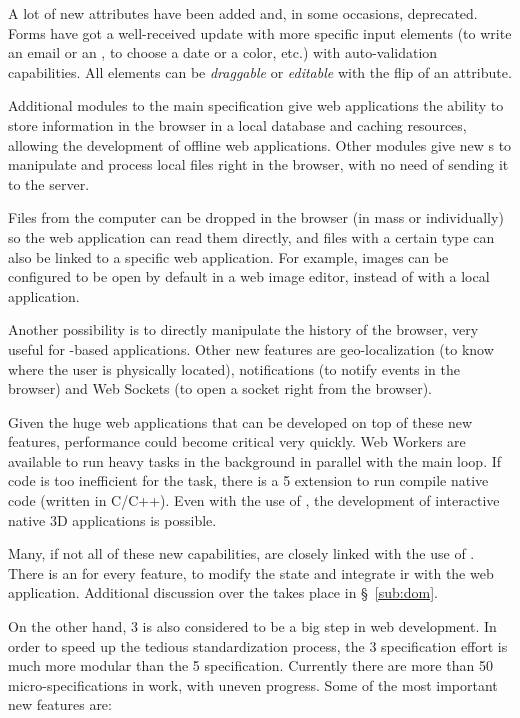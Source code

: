 A lot of new attributes have been added and, in some occasions, deprecated.
Forms have got a well-received update with more specific input elements (to write an email or an , to choose a date or a color, etc.) with auto-validation capabilities.
All elements can be \emph{draggable} or \emph{editable} with the flip of an attribute.

Additional modules to the main specification give web applications the ability to store information in the browser in a local database and caching resources, allowing the development of offline web applications.
Other modules give new s to manipulate and process local files right in the browser, with no need of sending it to the server.

Files from the computer can be dropped in the browser (in mass or individually) so the web application can read them directly, and files with a certain  type can also be linked to a specific web application.
For example, images can be configured to be open by default in a web image editor, instead of with a local application.

Another possibility is to directly manipulate the history of the browser, very useful for -based applications.
Other new features are geo-localization (to know where the user is physically located), notifications (to notify events in the browser) and Web Sockets (to open a socket right from the browser).

Given the huge web applications that can be developed on top of these new features, performance could become critical very quickly.
Web Workers are available to run heavy tasks in the background in parallel with the main loop.
If  code is too inefficient for the task, there is a  5 extension to run compile native code (written in C/C++).
Even with the use of , the development of interactive native 3D applications is possible.

Many, if not all of these new capabilities, are closely linked with the use of .
There is an  for every feature, to modify the state and integrate ir with the web application.
Additional discussion over the  takes place in \S~\ref{sub:dom}.

On the other hand,  3 is also considered to be a big step in web development.
In order to speed up the tedious standardization process, the  3 specification effort is much more modular than the  5 specification.
Currently there are more than 50 micro-specifications in work, with uneven progress.
Some of the most important new features are:

